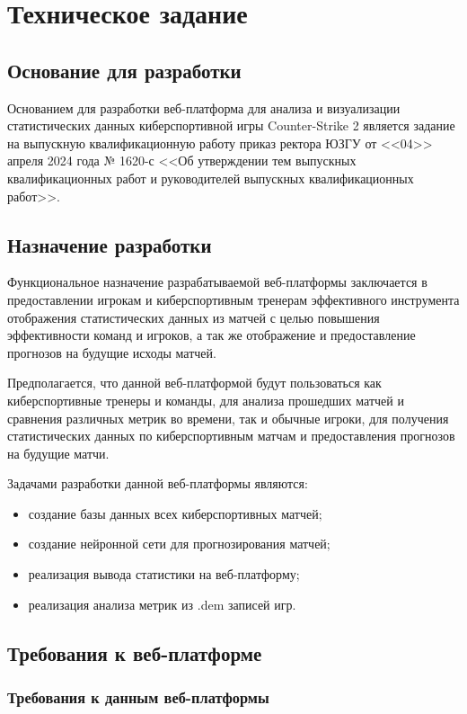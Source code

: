 \newsection
\section{Техническое задание}
\subsection{Основание для разработки}

Основанием для разработки веб-платформа для анализа и визуализации статистических данных киберспортивной игры Counter-Strike 2 является задание на выпускную квалификационную работу приказ ректора ЮЗГУ от <<04>> апреля 2024 года № 1620-с <<Об утверждении тем выпускных квалификационных работ и руководителей выпускных квалификационных работ>>.

\subsection{Назначение разработки}

Функциональное назначение разрабатываемой веб-платформы заключается в предоставлении игрокам и киберспортивным тренерам эффективного инструмента отображения статистических данных из матчей с целью повышения эффективности команд и игроков, а так же отображение и предоставление прогнозов на будущие исходы матчей.

Предполагается, что данной веб-платформой будут пользоваться как киберспортивные тренеры и команды, для анализа прошедших матчей и сравнения различных метрик во времени, так и обычные игроки, для получения статистических данных по киберспортивным матчам и предоставления прогнозов на будущие матчи.

Задачами разработки данной веб-платформы являются:
\begin{itemize}
	\item создание базы данных всех киберспортивных матчей;
	\item создание нейронной сети для прогнозирования матчей;
	\item реализация вывода статистики на веб-платформу;
	\item реализация анализа метрик из .dem записей игр.
\end{itemize}

\subsection{Требования к веб-платформе}
\subsubsection{Требования к данным веб-платформы}


